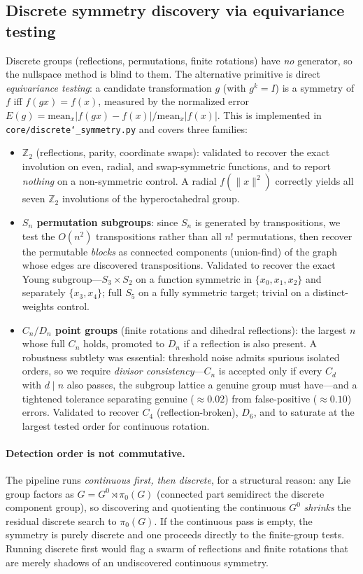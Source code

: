 \documentclass[11pt]{article}
\newcommand{\allowbreakhere}{\discretionary{}{}{}}
\newcommand{\code}[1]{\texttt{\def\_{\char`_\allowbreakhere}#1}}
\begin{document}
\subsection{Discrete symmetry discovery via equivariance testing}
\label{sec:discretediscovery}

Discrete groups (reflections, permutations, finite rotations) have \emph{no} generator, so the
nullspace method is blind to them. The alternative primitive is direct \emph{equivariance testing}:
a candidate transformation $g$ (with $g^k=I$) is a symmetry of $f$ iff $f(gx)=f(x)$, measured by the
normalized error $E(g)=\mathrm{mean}_x|f(gx)-f(x)|/\mathrm{mean}_x|f(x)|$. This is implemented in
\code{core/discrete\_symmetry.py} and covers three families:

\begin{itemize}[leftmargin=1.4em,itemsep=1pt]
\item \textbf{$\mathbb{Z}_2$} (reflections, parity, coordinate swaps): validated to recover the exact
involution on even, radial, and swap-symmetric functions, and to report \emph{nothing} on a
non-symmetric control. A radial $f(\|x\|^2)$ correctly yields all seven $\mathbb{Z}_2$ involutions
of the hyperoctahedral group.
\item \textbf{$S_n$ permutation subgroups}: since $S_n$ is generated by transpositions, we test the
$O(n^2)$ transpositions rather than all $n!$ permutations, then recover the permutable
\emph{blocks} as connected components (union-find) of the graph whose edges are discovered
transpositions. Validated to recover the exact Young subgroup---$S_3\times S_2$ on a function
symmetric in $\{x_0,x_1,x_2\}$ and separately $\{x_3,x_4\}$; full $S_5$ on a fully symmetric target;
trivial on a distinct-weights control.
\item \textbf{$C_n/D_n$ point groups} (finite rotations and dihedral reflections): the largest $n$
whose full $C_n$ holds, promoted to $D_n$ if a reflection is also present. A robustness subtlety was
essential: threshold noise admits spurious isolated orders, so we require \emph{divisor
consistency}---$C_n$ is accepted only if every $C_d$ with $d\mid n$ also passes, the subgroup
lattice a genuine group must have---and a tightened tolerance separating genuine ($\approx0.02$) from
false-positive ($\approx0.10$) errors. Validated to recover $C_4$ (reflection-broken), $D_6$, and to
saturate at the largest tested order for continuous rotation.
\end{itemize}

\paragraph{Detection order is not commutative.} The pipeline runs \emph{continuous first, then
discrete}, for a structural reason: any Lie group factors as $G=G^0\rtimes\pi_0(G)$ (connected part
semidirect the discrete component group), so discovering and quotienting the continuous $G^0$
\emph{shrinks} the residual discrete search to $\pi_0(G)$. If the continuous pass is empty, the
symmetry is purely discrete and one proceeds directly to the finite-group tests. Running discrete
first would flag a swarm of reflections and finite rotations that are merely shadows of an
undiscovered continuous symmetry.
\end{document}
